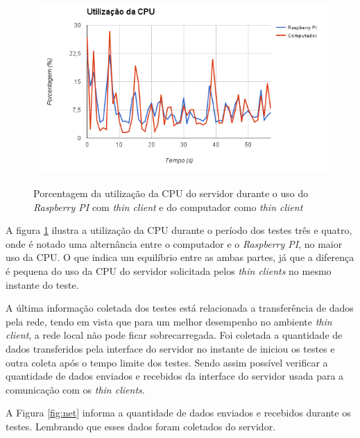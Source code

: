 \documentclass[
	12pt,				%
	openright,			%
	twoside,			%
	a4paper,			%
	chapter=TITLE,		%
	english,			%
	brazil				%
	]{abntex2}
\begin{document}
\begin{figure}[!htb]
\centering
\caption{Porcentagem da utilização da CPU do servidor durante o uso do \textit{Raspberry PI} com \textit{thin client} e do computador como \textit{thin client}}
\includegraphics[scale=0.8]{Imagens/cpu_2}
\label{fig:cpu}
\end{figure}

A figura \ref{fig:cpu} ilustra a utilização da CPU durante o período dos testes três e quatro, onde é notado uma alternância entre o computador e o \textit{Raspberry PI}, no maior uso da CPU. O que indica um equilíbrio entre as ambas partes, já que a diferença é pequena do uso da CPU do servidor solicitada pelos \textit{thin clients}  no mesmo instante do teste.

A última informação coletada dos testes está relacionada a transferência de dados pela rede, tendo em vista que para um melhor desempenho no ambiente \textit{thin client}, a rede local não pode ficar sobrecarregada. Foi coletada a quantidade de dados transferidos pela interface do servidor no instante de iniciou os testes e outra coleta após o tempo limite dos testes. Sendo assim possível verificar a quantidade de dados enviados e recebidos da interface do servidor usada para a comunicação com os \textit{thin clients}.

A Figura \ref{fig:net} informa a quantidade de dados enviados e recebidos durante os testes. Lembrando que esses dados foram coletados do servidor.
\end{document}
